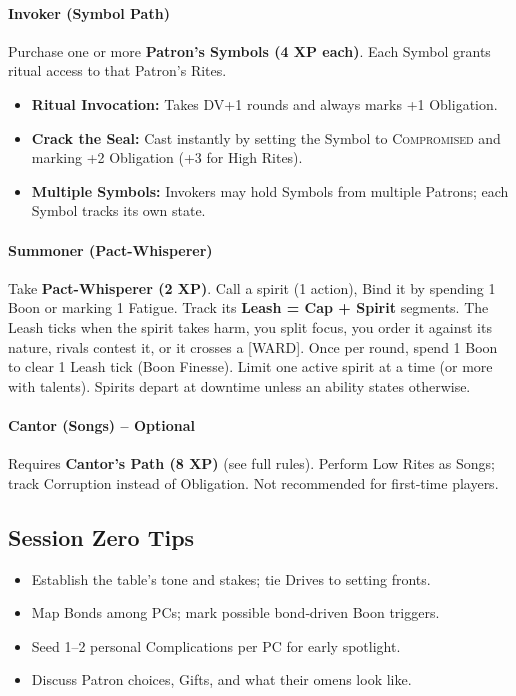 \paragraph{Invoker (Symbol Path)}
Purchase one or more \textbf{Patron's Symbols (4 XP each)}. Each Symbol grants ritual access to that Patron's Rites.
\begin{itemize}
  \item \textbf{Ritual Invocation:} Takes DV+1 rounds and always marks +1 Obligation.
  \item \textbf{Crack the Seal:} Cast instantly by setting the Symbol to \textsc{Compromised} and marking +2 Obligation (+3 for High Rites).
  \item \textbf{Multiple Symbols:} Invokers may hold Symbols from multiple Patrons; each Symbol tracks its own state.
\end{itemize}

\paragraph{Summoner (Pact-Whisperer)}
Take \textbf{Pact-Whisperer (2 XP)}. Call a spirit (1 action), Bind it by spending 1 Boon or marking 1 Fatigue. Track its \textbf{Leash = Cap + Spirit} segments. The Leash ticks when the spirit takes harm, you split focus, you order it against its nature, rivals contest it, or it crosses a [WARD]. Once per round, spend 1 Boon to clear 1 Leash tick (Boon Finesse). Limit one active spirit at a time (or more with talents). Spirits depart at downtime unless an ability states otherwise.

\paragraph{Cantor (Songs) -- Optional}
Requires \textbf{Cantor's Path (8 XP)} (see full rules). Perform Low Rites as Songs; track Corruption instead of Obligation. Not recommended for first‑time players.

\subsection{Session Zero Tips}
\begin{itemize}
  \item Establish the table's tone and stakes; tie Drives to setting fronts.
  \item Map Bonds among PCs; mark possible bond‑driven Boon triggers.
  \item Seed 1--2 personal Complications per PC for early spotlight.
  \item Discuss Patron choices, Gifts, and what their omens look like.
\end{itemize}